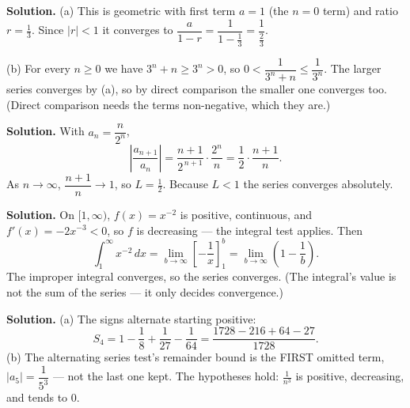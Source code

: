 \documentclass[12pt]{article}
\begin{document}



\textbf{Solution.} (a) This is geometric with first term $a=1$ (the $n=0$ term) and ratio $r=\tfrac{1}{3}$. Since $|r|<1$ it converges to $\dfrac{a}{1-r}=\dfrac{1}{1-\tfrac{1}{3}}=\dfrac{1}{\tfrac{2}{3}}$.
\par
(b) For every $n\ge 0$ we have $3^{n}+n\ge 3^{n}>0$, so $0<\dfrac{1}{3^{n}+n}\le\dfrac{1}{3^{n}}$. The larger series converges by (a), so by direct comparison the smaller one converges too. (Direct comparison needs the terms non-negative, which they are.)



\textbf{Solution.} With $a_{n}=\dfrac{n}{2^{n}}$,
\[
\left|\frac{a_{n+1}}{a_{n}}\right|=\frac{n+1}{2^{\,n+1}}\cdot\frac{2^{n}}{n}=\frac{1}{2}\cdot\frac{n+1}{n}.
\]
As $n\to\infty$, $\dfrac{n+1}{n}\to 1$, so $L=\tfrac{1}{2}$. Because $L<1$ the series converges absolutely.



\textbf{Solution.} On $[1,\infty)$, $f(x)=x^{-2}$ is positive, continuous, and $f'(x)=-2x^{-3}<0$, so $f$ is decreasing --- the integral test applies. Then
\[
\int_{1}^{\infty}x^{-2}\,dx=\lim_{b\to\infty}\left[-\frac{1}{x}\right]_{1}^{b}=\lim_{b\to\infty}\left(1-\frac{1}{b}\right).
\]
The improper integral converges, so the series converges. (The integral's value is not the sum of the series --- it only decides convergence.)



\textbf{Solution.} (a) The signs alternate starting positive:
\[
S_{4}=1-\frac{1}{8}+\frac{1}{27}-\frac{1}{64}
=\frac{1728-216+64-27}{1728}.
\]
(b) The alternating series test's remainder bound is the FIRST omitted term, $|a_{5}|=\dfrac{1}{5^{3}}$ --- not the last one kept. The hypotheses hold: $\tfrac{1}{n^{3}}$ is positive, decreasing, and tends to $0$.
\end{document}
